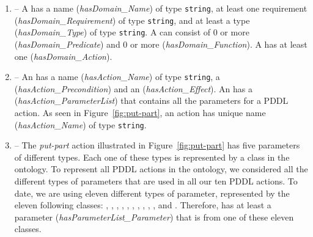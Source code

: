 %
%
\begin{enumerate}
\item {} -- A  has a name (\emph{hasDomain\_Name}) of type 
\texttt{string}, at least one requirement (\emph{hasDomain\_Requirement}) of type 
\texttt{string}, and at least a type (\emph{hasDomain\_Type}) of type \texttt{string}. 
A  can consist of 0 or more  (\emph{hasDomain\_Predicate}) 
and 0 or more  (\emph{hasDomain\_Function}). A  has 
at least one  (\emph{hasDomain\_Action}).
\item {} -- An  has a name (\emph{hasAction\_Name}) of 
type \texttt{string}, a  (\emph{hasAction\_Precondition}) and 
an  (\emph{hasAction\_Effect}). An  has a 
 (\emph{hasAction\_ParameterList}) that contains all the 
parameters for a PDDL action. As seen in Figure~\ref{fig:put-part}, an action 
has unique name (\emph{hasAction\_Name}) of type \texttt{string}.
\item {} -- The \textsl{put-part} action illustrated in 
Figure~\ref{fig:put-part} has five parameters of different types. Each one of 
these types is represented by a class in the  ontology. To represent 
all PDDL actions in the  ontology, we considered all the different types 
of parameters that are used in all our ten PDDL actions. To date, we are using eleven 
different types of parameter, represented by the eleven following classes: 
, , , , 
, , , 
, , , and . 
Therefore,  has at least a parameter 
(\emph{hasParameterList\_Parameter}) that is from one of these eleven classes.


\end{enumerate}
